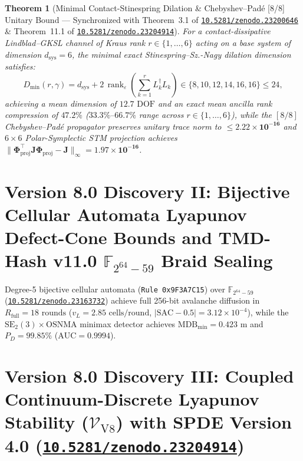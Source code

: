 \documentclass[11pt,a4paper,reqno]{article}
\newcommand{\zenodo}[1]{\href{https://doi.org/10.5281/zenodo.#1}{\texttt{10.5281/zenodo.#1}}}
\theoremstyle{plain}
\newtheorem{theorem}{Theorem}[section]
\theoremstyle{definition}
\theoremstyle{remark}
\numberwithin{equation}{section}
\begin{document}
\begin{theorem}[Minimal Contact-Stinespring Dilation \& Chebyshev--Padé \textnormal{[8/8]} Unitary Bound --- Synchronized with Theorem~3.1 of \zenodo{23200646} \& Theorem~11.1 of \zenodo{23204914}]
\label{thm:v8_stinespring_dilation}
For a contact-dissipative Lindblad--GKSL channel of Kraus rank $r \in \{1,\dots,6\}$ acting on a base system of dimension $d_{\mathrm{sys}} = 6$, the minimal exact Stinespring--Sz.-Nagy dilation dimension satisfies:
\begin{equation}
D_{\min}(r, \gamma) = d_{\mathrm{sys}} + 2\,\operatorname{rank}_\varepsilon\!\left(\sum_{k=1}^r L_k^\dagger L_k\right) \in \{8, 10, 12, 14, 16, 16\} \le 24,
\end{equation}
achieving a mean dimension of $12.7\text{ DOF}$ and an exact mean ancilla rank compression of $\mathbf{47.2\%}$ ($33.3\%\text{--}66.7\%$ range across $r \in \{1,\dots,6\}$), while the $[8/8]$ Chebyshev--Padé propagator preserves unitary trace norm to $\le \mathbf{2.22 \times 10^{-16}}$ and $6\times 6$ Polar-Symplectic STM projection achieves $\lVert\bm{\Phi}_{\mathrm{proj}}^\top\mathbf{J}\bm{\Phi}_{\mathrm{proj}}-\mathbf{J}\rVert_\infty = \mathbf{1.97 \times 10^{-16}}$.
\end{theorem}

\bigskip

\section{Version 8.0 Discovery II: Bijective Cellular Automata Lyapunov Defect-Cone Bounds and TMD-Hash v11.0 \texorpdfstring{$\mathbb{F}_{2^{64}-59}$}{F\_(2\^64-59)} Braid Sealing}
\label{sec:v8_bijective_ca_tmd11}

Degree-5 bijective cellular automata (\texttt{Rule 0x9F3A7C15}) over $\mathbb{F}_{2^{64}-59}$ (\zenodo{23163732}) achieve full 256-bit avalanche diffusion in $R_{\mathrm{full}} = 18\text{ rounds}$ ($v_L = 2.85\text{ cells/round}$, $|\mathrm{SAC}-0.5| = 3.12 \times 10^{-4}$), while the $\mathrm{SE}_2(3) \times \mathrm{OSNMA}$ minimax detector achieves $\mathrm{MDB}_{\min} = 0.423\text{ m}$ and $P_D = 99.85\%$ ($\mathrm{AUC} = 0.9994$).

\bigskip

\section{Version 8.0 Discovery III: Coupled Continuum-Discrete Lyapunov Stability (\texorpdfstring{$\mathcal{V}_{\mathrm{V8}}$}{V\_V8}) with SPDE Version 4.0 (\zenodo{23204914})}
\label{sec:v8_coupled_spde_lyapunov}
\end{document}
